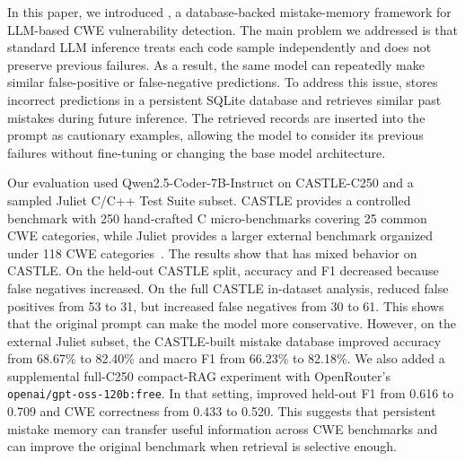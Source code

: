 \label{sec:conclude}

In this paper, we introduced \system, a database-backed mistake-memory framework for LLM-based CWE vulnerability detection. The main problem we addressed is that standard LLM inference treats each code sample independently and does not preserve previous failures. As a result, the same model can repeatedly make similar false-positive or false-negative predictions. To address this issue, \system stores incorrect predictions in a persistent SQLite database and retrieves similar past mistakes during future inference. The retrieved records are inserted into the prompt as cautionary examples, allowing the model to consider its previous failures without fine-tuning or changing the base model architecture.

Our evaluation used Qwen2.5-Coder-7B-Instruct on CASTLE-C250 and a sampled Juliet C/C++ Test Suite subset. CASTLE provides a controlled benchmark with 250 hand-crafted C micro-benchmarks covering 25 common CWE categories, while Juliet provides a larger external benchmark organized under 118 CWE categories~\cite{castle,castle_github,juliet_nist}. The results show that \system has mixed behavior on CASTLE. On the held-out CASTLE split, accuracy and F1 decreased because false negatives increased. On the full CASTLE in-dataset analysis, \system reduced false positives from 53 to 31, but increased false negatives from 30 to 61. This shows that the original prompt can make the model more conservative. However, on the external Juliet subset, the CASTLE-built mistake database improved accuracy from 68.67\% to 82.40\% and macro F1 from 66.23\% to 82.18\%. We also added a supplemental full-C250 compact-RAG experiment with OpenRouter's \texttt{openai/gpt-oss-120b:free}. In that setting, \system improved held-out F1 from 0.616 to 0.709 and CWE correctness from 0.433 to 0.520. This suggests that persistent mistake memory can transfer useful information across CWE benchmarks and can improve the original benchmark when retrieval is selective enough.

